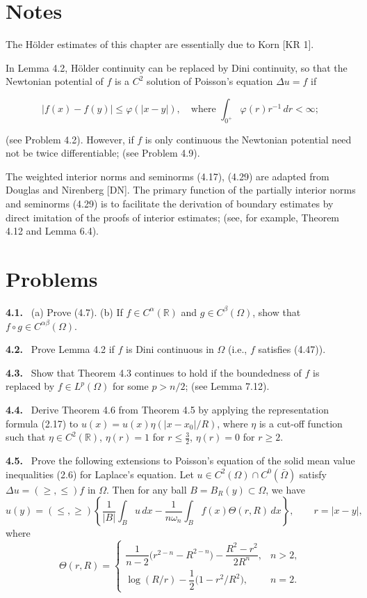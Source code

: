 \section*{Notes}

The Hölder estimates of this chapter are essentially due to Korn [KR 1].

In Lemma 4.2, Hölder continuity can be replaced by Dini continuity, so that the Newtonian potential of $f$ is a $C^2$ solution of Poisson's equation $\Delta u = f$ if

\begin{equation}
\tag{4.47}
|f(x)-f(y)| \leq \varphi(|x-y|), \quad \text{where } \int_{0^+} \varphi(r)r^{-1}\,dr < \infty;
\end{equation}

(see Problem 4.2). However, if $f$ is only continuous the Newtonian potential need not be twice differentiable; (see Problem 4.9).

The weighted interior norms and seminorms (4.17), (4.29) are adapted from Douglas and Nirenberg [DN]. The primary function of the partially interior norms and seminorms (4.29) is to facilitate the derivation of boundary estimates by direct imitation of the proofs of interior estimates; (see, for example, Theorem 4.12 and Lemma 6.4).

\section*{Problems}

\textbf{4.1.} \ (a) Prove (4.7). (b) If $f \in C^{\alpha}(\mathbb{R})$ and $g \in C^{\beta}(\Omega)$, show that $f \circ g \in C^{\alpha\beta}(\Omega)$.

\textbf{4.2.} \ Prove Lemma 4.2 if $f$ is Dini continuous in $\Omega$ (i.e., $f$ satisfies (4.47)).

\textbf{4.3.} \ Show that Theorem 4.3 continues to hold if the boundedness of $f$ is replaced by $f \in L^p(\Omega)$ for some $p > n/2$; (see Lemma 7.12).

\textbf{4.4.} \ Derive Theorem 4.6 from Theorem 4.5 by applying the representation formula (2.17) to $u(x)=u(x)\eta(|x-x_0|/R)$, where $\eta$ is a cut-off function such that $\eta \in C^2(\mathbb{R})$, $\eta(r)=1$ for $r \leq \frac{3}{2}$, $\eta(r)=0$ for $r \geq 2$.


\textbf{4.5.} \ Prove the following extensions to Poisson's equation of the solid mean value inequalities (2.6) for Laplace's equation. Let \(u \in C^2(\Omega) \cap C^0(\bar\Omega)\) satisfy \(\Delta u = (\ge,\le) f\) in \(\Omega\). Then for any ball \(B = B_R(y) \subset \Omega\), we have
\[
u(y) = (\le,\ge)\left\{\frac{1}{\lvert B\rvert}\int_B u\,dx - \frac{1}{n\omega_n}\int_B f(x)\Theta(r,R)\,dx\right\},\qquad r = \lvert x-y\rvert,
\]
where
\[
\Theta(r,R)=
\begin{cases}
\dfrac{1}{n-2}\bigl(r^{2-n}-R^{2-n}\bigr)-\dfrac{R^2-r^2}{2R^n}, & n>2,\\[6pt]
\log(R/r)-\dfrac{1}{2}\bigl(1-r^2/R^2\bigr), & n=2.
\end{cases}
\]

